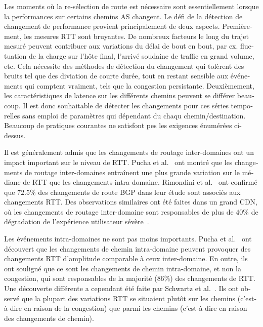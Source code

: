 \begin{otherlanguage}{french}
Les moments où la re-sélection de route est nécessaire sont essentiellement lorsque 
la performances sur certains chemins AS changent.
Le défi de la détection de changement de performance provient principalement de deux aspects.
Premièrement, les mesures RTT sont bruyantes.
De nombreux facteurs le long du trajet mesuré peuvent contribuer aux variations du délai de bout en bout, 
par ex. fluctuation de la charge sur l'hôte final, l'arrivé soudaine de traffic en grand volume, etc.
Cela nécessite des méthodes de détection du changement qui tolèrent des bruits tel que des diviation de courte durée,
tout en restant sensible aux événements qui comptent vraiment, tels que la congestion persistante.
Deuxièmement, les caractéristiques de latence sur les différents chemins peuvent se différer beaucoup.
Il est donc souhaitable de détecter les changements pour ces séries temporelles 
sans emploi de paramètres qui dépendant du chaqu chemin/destination.
Beaucoup de pratiques courantes ne satisfont pes les exigences énumérées ci-dessus.

Il est généralement admis que les changements de routage inter-domaines ont un impact important sur le niveau de RTT.
Pucha et al.~\cite{Pucha2007} ont montré que les changements de routage inter-domaines 
entraînent une plus grande variation sur le médiane de RTT que les changements intra-domaine.
Rimondini et al.~\cite{Rimondini2014} ont confirmé que $72.5\%$ des changements de route BGP 
dans leur étude sont associés aux changements RTT.
Des observations similaires ont été faites dans un grand \ac{CDN}, 
où les changements de routage inter-domaine sont responsables de plus de $40\%$ de dégradation de l'expérience utilisateur sévère~\cite{Zhu2012}.

Les événements intra-domaines ne sont pas moins importants. 
Pucha et al.~\cite{Pucha2007} ont découvert que les changements de chemin intra-domaine peuvent provoquer 
des changements RTT d'amplitude comparable à ceux inter-domaine.
En outre, ils ont souligné que ce sont les changements de chemin intra-domaine, et non la congestion, 
qui sont responsables de la majorité ($86\%$) des changements de RTT. %
Une découverte différente a cependant été faite par Schwartz et al.~\cite{Schwartz2010}. 
Ils ont observé que la plupart des variations RTT se situaient plutôt sur les chemins (c'est-à-dire en raison de la congestion) 
que parmi les chemins (c'est-à-dire en raison des changements de chemin).


\end{otherlanguage}
